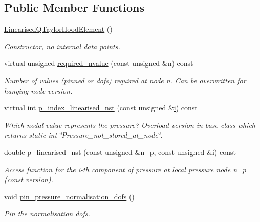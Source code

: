 \subsection*{Public Member Functions}
\begin{DoxyCompactItemize}
\item 
\hyperlink{classoomph_1_1LinearisedQTaylorHoodElement_ad12c05ff1bac20a6e7d344df2ab064a0}{Linearised\+Q\+Taylor\+Hood\+Element} ()
\begin{DoxyCompactList}\small\item\em Constructor, no internal data points. \end{DoxyCompactList}\item 
virtual unsigned \hyperlink{classoomph_1_1LinearisedQTaylorHoodElement_ad91af0bc54b6c61cf43cbf867e939bc9}{required\+\_\+nvalue} (const unsigned \&n) const
\begin{DoxyCompactList}\small\item\em Number of values (pinned or dofs) required at node n. Can be overwritten for hanging node version. \end{DoxyCompactList}\item 
virtual int \hyperlink{classoomph_1_1LinearisedQTaylorHoodElement_a9b411b9d761bbefa1ff7133fd053433f}{p\+\_\+index\+\_\+linearised\+\_\+nst} (const unsigned \&\hyperlink{cfortran_8h_adb50e893b86b3e55e751a42eab3cba82}{i}) const
\begin{DoxyCompactList}\small\item\em Which nodal value represents the pressure? Overload version in base class which returns static int \char`\"{}\+Pressure\+\_\+not\+\_\+stored\+\_\+at\+\_\+node\char`\"{}. \end{DoxyCompactList}\item 
double \hyperlink{classoomph_1_1LinearisedQTaylorHoodElement_a9f8724c0006b99cf422040d429033828}{p\+\_\+linearised\+\_\+nst} (const unsigned \&n\+\_\+p, const unsigned \&\hyperlink{cfortran_8h_adb50e893b86b3e55e751a42eab3cba82}{i}) const
\begin{DoxyCompactList}\small\item\em Access function for the i-\/th component of pressure at local pressure node n\+\_\+p (const version). \end{DoxyCompactList}\item 
void \hyperlink{classoomph_1_1LinearisedQTaylorHoodElement_a21bc414ed57b79f986d4f1bff6cece4b}{pin\+\_\+pressure\+\_\+normalisation\+\_\+dofs} ()
\begin{DoxyCompactList}\small\item\em Pin the normalisation dofs. \end{DoxyCompactList}\item 

\end{DoxyCompactItemize}
